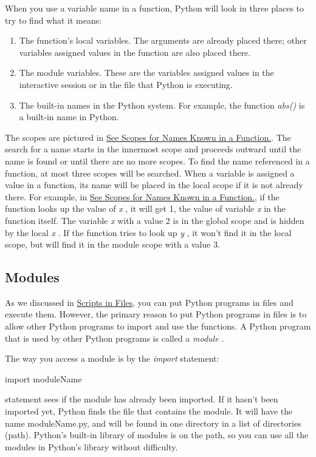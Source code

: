 When you use a variable name in a
function, Python will look in three places to try to find what it means:

\begin{enumerate}
\tightlist
\item
  The function's local variables.
  The arguments are already placed there; other variables assigned
  values in the function are also placed there.
\item
  The module variables. These are
  the variables assigned values in the interactive session or in the
  file that Python is executing.
\item
  The built-in names in the Python
  system. For example, the function \emph{abs()} is a built-in name in
  Python.
\end{enumerate}

The scopes are pictured in
\href{chap2.html\#83458}{See Scopes for Names Known in a Function.}. The
search for a name starts in the innermost scope and proceeds outward
until the name is found or until there are no more scopes. To find the
name referenced in a function, at most three scopes will be searched.
When a variable is assigned a value in a function, its name will be
placed in the local scope if it is not already there. For example, in
\href{chap2.html\#83458}{See Scopes for Names Known in a Function.}, if
the function looks up the value of \emph{x} , it will get 1, the value
of variable \emph{x} in the function itself. The variable \emph{x} with
a value 2 is in the global scope and is hidden by the local \emph{x} .
If the function tries to look up \emph{y} , it won't find it in the
local scope, but will find it in the module scope with a value 3.


\subsection{Modules}

As we discussed in
\href{chap2.html\#30113}{Scripts in Files}, you can put Python programs
in files and execute them. However, the primary reason to put Python
programs in files is to allow other Python programs to import and use
the functions. A Python program that is used by other Python programs is
called a \emph{module} .

The way you access a module is by
the \emph{import} statement:

import moduleName

 statement sees if
the module has already been imported. If it hasn't been imported yet,
Python finds the file that contains the module. It will have the name
moduleName.py, and will be found in one directory in a list of
directories (path). Python's built-in library of modules is on the path,
so you can use all the modules in Python's library without difficulty.


